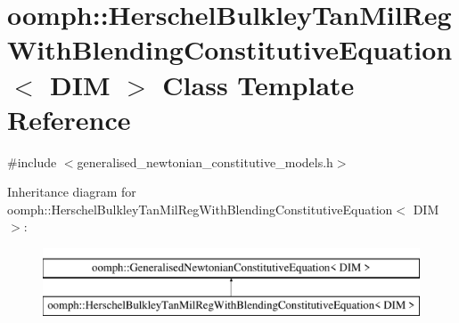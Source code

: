 \hypertarget{classoomph_1_1HerschelBulkleyTanMilRegWithBlendingConstitutiveEquation}{}\section{oomph\+:\+:Herschel\+Bulkley\+Tan\+Mil\+Reg\+With\+Blending\+Constitutive\+Equation$<$ D\+IM $>$ Class Template Reference}
\label{classoomph_1_1HerschelBulkleyTanMilRegWithBlendingConstitutiveEquation}


{\ttfamily \#include $<$generalised\+\_\+newtonian\+\_\+constitutive\+\_\+models.\+h$>$}

Inheritance diagram for oomph\+:\+:Herschel\+Bulkley\+Tan\+Mil\+Reg\+With\+Blending\+Constitutive\+Equation$<$ D\+IM $>$\+:\begin{figure}[H]
\begin{center}
\leavevmode
\includegraphics[height=2.000000cm]{classoomph_1_1HerschelBulkleyTanMilRegWithBlendingConstitutiveEquation}
\end{center}
\end{figure}
